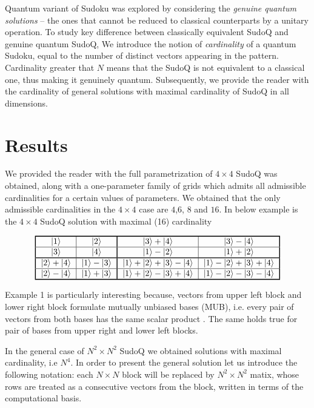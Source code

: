 \documentclass[11pt]{article}
\begin{document}
Quantum variant of Sudoku was explored by considering the \emph{genuine quantum solutions} – the ones that cannot be reduced to classical counterparts by a unitary operation. 
To study key difference between classically equivalent SudoQ and genuine quantum SudoQ, We introduce the notion of \emph{cardinality} of a quantum Sudoku, equal to the number of distinct vectors appearing in the pattern. Cardinality greater that $N$ means that the SudoQ is not equivalent to a classical one, thus making it genuinely quantum. Subsequently, we provide the reader with the cardinality of general solutions with maximal cardinality of SudoQ in all dimensions. 


\section{Results}
We provided the reader with the full parametrization of $4 \times 4$ SudoQ was obtained, along with a one-parameter family of grids which admits all admissible cardinalities for a certain values of parameters. We obtained that the only admissible cardinalities in the $4 \times 4$ case are $4$,$6$, $8$ and $16$.
In below example is the $4 \times 4$ SudoQ solution with maximal (16) cardinality
\begin{example}{}\label{ex:4x4_card16}
\[
 \begin{tabular}{!{\vrule width 1pt}c|c!{\vrule width 1pt}c|c!{\vrule width 1pt}}
    \noalign{\hrule height 1pt}
    $\ket{1}$ & $\ket{2}$ & $\ket{3}+\ket{4}$ & $\ket{3}-\ket{4}$ \tabularnewline
    \hline
    $\ket{3}$ & $\ket{4}$ & $\ket{1}-\ket{2}$ & $\ket{1}+\ket{2}$ \tabularnewline
    \noalign{\hrule height 1pt}
    $\ket{2}+\ket{4}$ & $\ket{1}-\ket{3}$ & $\ket{1}+\ket{2}+\ket{3}-\ket{4}$ & $\ket{1}-\ket{2}+\ket{3}+\ket{4}$ \tabularnewline
    \hline
    $\ket{2}-\ket{4}$ & $\ket{1}+\ket{3}$ & $\ket{1}+\ket{2}-\ket{3}+\ket{4}$ & $\ket{1}-\ket{2}-\ket{3}-\ket{4}$ \tabularnewline
    \noalign{\hrule height 1pt}
\end{tabular}
\]
\end{example}

Example 1 is particularly interesting because, vectors from upper left block and lower right block formulate mutually unbiased bases (MUB), i.e. every pair of vectors from both bases has the same scalar product \cite{Ivonovic_1981,Wooters_1989}. The same holds true for pair of bases from upper right and lower left blocks.


In the general case of $N^{2} \times N^{2}$ SudoQ we obtained solutions with maximal cardinality, i.e $N^{4}$. In order to present the general solution let us introduce the following notation: each $N \times N$ block will be replaced by $N^{2} \times N^{2}$ matix, whose rows are treated as a consecutive vectors from the block, written in terms of the computational basis. 
\end{document}
